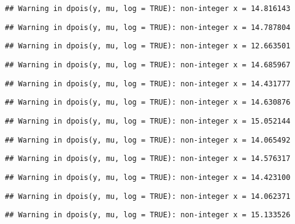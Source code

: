 \documentclass[
]{article}
\begin{document}
\begin{verbatim}
## Warning in dpois(y, mu, log = TRUE): non-integer x = 14.816143
\end{verbatim}

\begin{verbatim}
## Warning in dpois(y, mu, log = TRUE): non-integer x = 14.787804
\end{verbatim}

\begin{verbatim}
## Warning in dpois(y, mu, log = TRUE): non-integer x = 12.663501
\end{verbatim}

\begin{verbatim}
## Warning in dpois(y, mu, log = TRUE): non-integer x = 14.685967
\end{verbatim}

\begin{verbatim}
## Warning in dpois(y, mu, log = TRUE): non-integer x = 14.431777
\end{verbatim}

\begin{verbatim}
## Warning in dpois(y, mu, log = TRUE): non-integer x = 14.630876
\end{verbatim}

\begin{verbatim}
## Warning in dpois(y, mu, log = TRUE): non-integer x = 15.052144
\end{verbatim}

\begin{verbatim}
## Warning in dpois(y, mu, log = TRUE): non-integer x = 14.065492
\end{verbatim}

\begin{verbatim}
## Warning in dpois(y, mu, log = TRUE): non-integer x = 14.576317
\end{verbatim}

\begin{verbatim}
## Warning in dpois(y, mu, log = TRUE): non-integer x = 14.423100
\end{verbatim}

\begin{verbatim}
## Warning in dpois(y, mu, log = TRUE): non-integer x = 14.062371
\end{verbatim}

\begin{verbatim}
## Warning in dpois(y, mu, log = TRUE): non-integer x = 15.133526
\end{verbatim}
\end{document}
